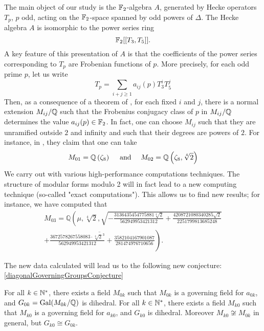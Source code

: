 The main object of our study is the $\mathbb{F}_2$-algebra $A$, generated by Hecke operators $T_p$, $p$ odd, acting on the $\mathbb{F}_2$-space spanned by odd powers of $\Delta$.
The Hecke algebra $A$ is isomorphic to the power series ring 
$$
\mathbb{F}_2[[T_3, T_5]].
$$
A key feature of this presentation of $A$ is that the coefficients of the power series corresponding to $T_p$ are Frobenian functions of $p$.
More precisely, for each odd prime $p$, let us write 
$$
T_p = \sum_{i+j \geq 1} a_{ij}(p)T_3^iT_5^j
$$
Then, as a consequence of a theorem of \cite{bellaiche}, for each fixed $i$ and $j$, there is a normal extension $M_{ij}/\mathbb{Q}$ such that the Frobenius conjugacy class of $p$ in $M_{ij}/\mathbb{Q}$ determines the value $a_{ij}(p) \in \mathbb{F}_2$.
In fact, one can choose $M_{ij}$ such that they are unramified outside $2$ and infinity and such that their degrees are powers of $2$.
For instance, in \cite{OrdreNilpotenceOperateurHecke}, they claim that one can take 
$$
M_{01} = \mathbb{Q}\left( \zeta_8 \right)
\quad \text{ and } \quad 
M_{02} = \mathbb{Q}\left( \zeta_8, \sqrt[4]{2} \right)
$$
We carry out with various high-performance computations techniques.
The structure of modular forms modulo 2 will in fact lead to a new computing technique (so-called "exact computations").
This allows us to find new results; for instance, we have computed that
\begin{multline*}
	M_{03} = \mathbb{Q}\left(\mu, \sqrt[4]{2}, \sqrt{
		- \frac{3136435454775881 \sqrt[4]{2}}{562949953421312} 
		+ \frac{4208721080340285 \sqrt{2}}{2251799813685248} 
	}\right. \\
	\left. \overline{ 
		+ \frac{3672578267558083 \cdot \sqrt[4]{2}^3}{562949953421312} 
		+ \frac{3582104167901087}{281474976710656}
	}\right).
\end{multline*}

The new data calculated will lead us to the following new conjecture:
\ref{diagonalGoverningGroupsConjecture}
\begin{conjecture}
	For all $k \in \mathbb{N}^*$, there exists a field $M_{0k}$ such that $M_{0k}$ is a governing field for $a_{0k}$, and $G_{0k} = \text{Gal}(M_{0k}/\mathbb{Q})$ is dihedral.
	For all $k \in \mathbb{N}^*$, there exists a field $M_{k0}$ such that $M_{k0}$ is a governing field for $a_{k0}$, and $G_{k0}$ is dihedral.
	Moreover $M_{k0} \not \cong M_{0k}$ in general, but $G_{k0} \cong G_{0k}$.
\end{conjecture}
